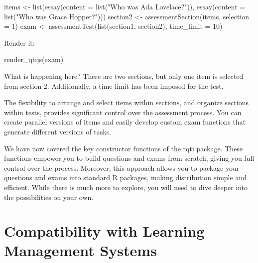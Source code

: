 \documentclass[twoside]{tufte-book}
\newenvironment{Shaded}{}{}
\newcommand{\AttributeTok}[1]{\textcolor[rgb]{0.49,0.56,0.16}{#1}}
\newcommand{\DecValTok}[1]{\textcolor[rgb]{0.25,0.63,0.44}{#1}}
\newcommand{\FunctionTok}[1]{\textcolor[rgb]{0.02,0.16,0.49}{#1}}
\newcommand{\NormalTok}[1]{#1}
\newcommand{\OtherTok}[1]{\textcolor[rgb]{0.00,0.44,0.13}{#1}}
\newcommand{\StringTok}[1]{\textcolor[rgb]{0.25,0.44,0.63}{#1}}
\begin{document}
\begin{Shaded}
\begin{Highlighting}[]
\NormalTok{items }\OtherTok{\textless{}{-}} \FunctionTok{list}\NormalTok{(}\FunctionTok{essay}\NormalTok{(}\AttributeTok{content =} \FunctionTok{list}\NormalTok{(}\StringTok{"Who was Ada Lovelace?"}\NormalTok{)), }
              \FunctionTok{essay}\NormalTok{(}\AttributeTok{content =} \FunctionTok{list}\NormalTok{(}\StringTok{"Who was Grace Hopper?"}\NormalTok{)))}
\NormalTok{section2 }\OtherTok{\textless{}{-}} \FunctionTok{assessmentSection}\NormalTok{(items, }\AttributeTok{selection =} \DecValTok{1}\NormalTok{)}
\NormalTok{exam }\OtherTok{\textless{}{-}} \FunctionTok{assessmentTest}\NormalTok{(}\FunctionTok{list}\NormalTok{(section1, section2), }\AttributeTok{time\_limit =} \DecValTok{10}\NormalTok{)}
\end{Highlighting}
\end{Shaded}

Render it:

\begin{Shaded}
\begin{Highlighting}[]
\FunctionTok{render\_qtijs}\NormalTok{(exam)}
\end{Highlighting}
\end{Shaded}

What is happening here? There are two sections, but only one item is selected from section 2. Additionally, a time limit has been imposed for the test.

The flexibility to arrange and select items within sections, and organize sections within tests, provides significant control over the assessment process. You can create parallel versions of items and easily develop custom exam functions that generate different versions of tasks.

We have now covered the key constructor functions of the rqti package. These functions empower you to build questions and exams from scratch, giving you full control over the process. Moreover, this approach allows you to package your questions and exams into standard R packages, making distribution simple and efficient. While there is much more to explore, you will need to dive deeper into the possibilities on your own.

\chapter{Compatibility with Learning Management Systems}\label{compatibility-with-learning-management-systems}
\end{document}
